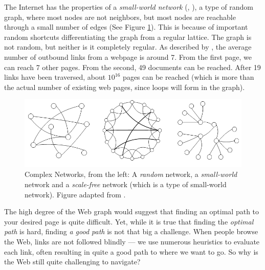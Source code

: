 The Internet has the properties of a \emph{small-world network} (\citep{Newman2000}, \citep[p2]{Huang2005}), 
a type of random graph, where most nodes are not neighbors, but most nodes are reachable through a small number of edges (See Figure \ref{fig:swn}). 
This is because of important random shortcuts differentiating the graph from a regular lattice. 
The graph is not  random, but neither is it completely regular.
As described by \citet[p37]{Barabasi2003}, the average number of outbound links from a webpage is around 7.
From the first page, we can reach 7 other pages. From the second, 49 documents can be reached. 
After 19 links have been traversed, about $10^{16}$ pages can be reached (which is more than the actual number of existing web pages, since loops will form in the graph).

\begin{figure}[t]
  \includegraphics[width=\textwidth]{../graphics/graphs}
  \caption[Examples of Complex Networks]{
    Complex Networks,
    from the left: A \emph{random} network, a \emph{small-world} network and a \emph{scale-free} network 
    (which is a type of  small-world network). Figure adapted from \citep[p2]{Huang2005}.} 
  \label{fig:swn}
\end{figure}


The high degree of the Web graph would suggest that finding an optimal path to your desired page is quite difficult. 
Yet, while it is true that finding the \emph{optimal path} is hard, finding \emph{a good path} is not that big a challenge. 
When people browse the Web, links are not followed blindly --- 
we use numerous heuristics to evaluate each link, often resulting in quite a good path to where we want to go. 
So why is the Web still quite challenging to navigate?

